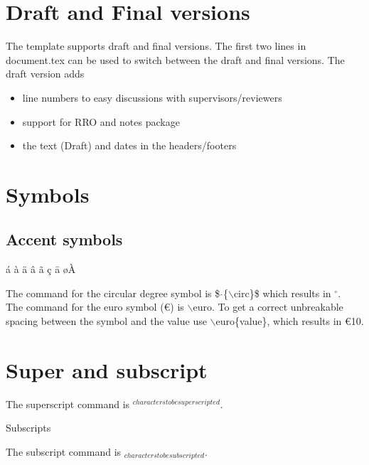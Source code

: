 \section{Draft and Final versions}
The template supports draft and final versions. The first two lines in document.tex can be used to switch between the draft and final versions. The draft version adds
\begin{itemize}
\item line numbers to easy discussions with supervisors/reviewers
\item support for RRO and notes package
\item the text (Draft) and dates in the headers/footers
\end{itemize}

\section{Symbols}
\subsection{Accent symbols}
\'{a} \`{a} \"{a} \^{a} \~{a}
\c{c} \={a} \o \`{A}

The command for the circular degree symbol is \$ $\hat{}$\{$\backslash$circ\}\$
which results in $^{\circ}$.\\
The command for the euro symbol (\euro) is $\backslash$euro. To get a correct
unbreakable spacing between the symbol and the value use
$\backslash$euro\{value\}, which results in \euro{10}.

\section{Super and subscript}
The superscript command is $^{characters to be superscripted}$.

Subscripts

The subscript command is $_{characters to be subscripted}$.

